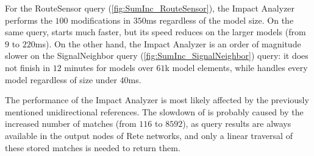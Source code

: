 For the \textsf{RouteSensor} query (\autoref{fig:SumInc_RouteSensor}), the Impact
Analyzer performs the $100$ modifications in $350$ms regardless of the model
size. On the same query, \incquery{} starts much faster, but its speed reduces
on the larger models (from $9$ to $220$ms). On the other hand, the Impact
Analyzer is an order of magnitude slower on the \textsf{SignalNeighbor} query
(\autoref{fig:SumInc_SignalNeighbor}) query: it does not finish in $12$ minutes
for models over $61$k model elements, while \incquery{} handles every model
regardless of size under $40$ms.

The performance of the Impact Analyzer is most likely affected by the previously
mentioned unidirectional references. The slowdown of \incquery{} is probably
caused by the increased number of matches (from $116$ to $8592$), as query
results are always available in the output nodes of Rete networks, and only a
linear traversal of these stored matches is needed to return them.


